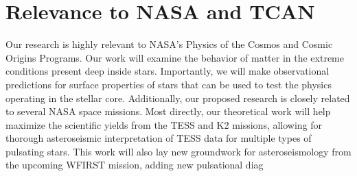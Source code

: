 {\color{orange}

\section{Relevance to NASA and TCAN}



Our research is highly relevant to NASA's Physics of the Cosmos and Cosmic Origins Programs. Our work will examine the behavior of matter in the extreme conditions present deep inside stars. Importantly, we will make observational predictions for surface properties of stars that can be used to test the physics operating in the stellar core. Additionally, our proposed research is closely related to several NASA space missions. Most directly, our theoretical work will help maximize the scientific yields from the TESS and K2 missions, allowing for thorough asteroseismic interpretation of TESS data for multiple types of pulsating stars. This work will also lay new groundwork for asteroseismology from the upcoming WFIRST mission, adding new pulsational diag


}